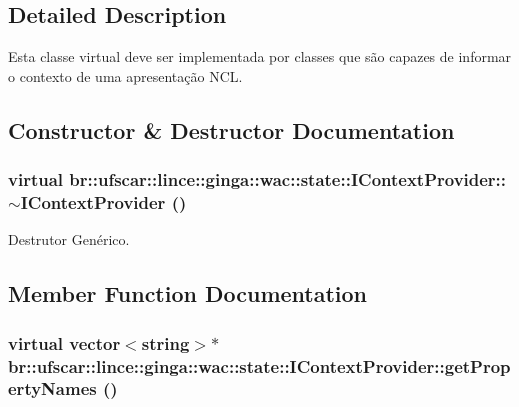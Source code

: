 \subsection{Detailed Description}
Esta classe virtual deve ser implementada por classes que são capazes de informar o contexto de uma apresentação NCL. 

\subsection{Constructor \& Destructor Documentation}
\hypertarget{classbr_1_1ufscar_1_1lince_1_1ginga_1_1wac_1_1state_1_1IContextProvider_a586f6b390cf22fb589aa3b6fb661dc49}{
\subsubsection[{$\sim$IContextProvider}]{\setlength{\rightskip}{0pt plus 5cm}virtual br::ufscar::lince::ginga::wac::state::IContextProvider::$\sim$IContextProvider ()}}
\label{classbr_1_1ufscar_1_1lince_1_1ginga_1_1wac_1_1state_1_1IContextProvider_a586f6b390cf22fb589aa3b6fb661dc49}


Destrutor Genérico. 



\subsection{Member Function Documentation}
\hypertarget{classbr_1_1ufscar_1_1lince_1_1ginga_1_1wac_1_1state_1_1IContextProvider_a1912620e1f978f7e12dba01b0c31af5c}{
\subsubsection[{getPropertyNames}]{\setlength{\rightskip}{0pt plus 5cm}virtual vector$<$string$>$$\ast$ br::ufscar::lince::ginga::wac::state::IContextProvider::getPropertyNames ()}}
\label{classbr_1_1ufscar_1_1lince_1_1ginga_1_1wac_1_1state_1_1IContextProvider_a1912620e1f978f7e12dba01b0c31af5c}


